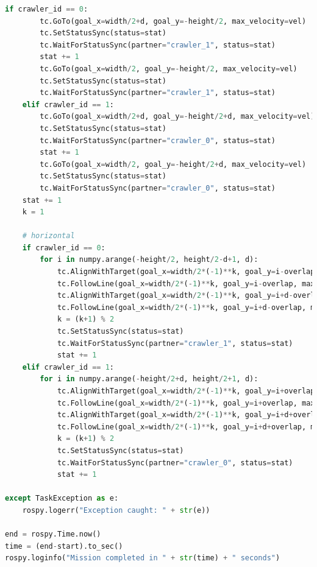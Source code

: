 \documentclass[francais,RandD]{rapportPFE}
\begin{document}
\begin{lstlisting}[language=Python,caption={Implémentation de l'algorithme de peinture au rouleau},label=lst:peinture_au_rouleau]
	if crawler_id == 0:
		tc.GoTo(goal_x=width/2+d, goal_y=-height/2, max_velocity=vel)
		tc.SetStatusSync(status=stat)
		tc.WaitForStatusSync(partner="crawler_1", status=stat)
		stat += 1
		tc.GoTo(goal_x=width/2, goal_y=-height/2, max_velocity=vel)
		tc.SetStatusSync(status=stat)
		tc.WaitForStatusSync(partner="crawler_1", status=stat)
	elif crawler_id == 1:
		tc.GoTo(goal_x=width/2+d, goal_y=-height/2+d, max_velocity=vel)
		tc.SetStatusSync(status=stat)
		tc.WaitForStatusSync(partner="crawler_0", status=stat)
		stat += 1
		tc.GoTo(goal_x=width/2, goal_y=-height/2+d, max_velocity=vel)
		tc.SetStatusSync(status=stat)
		tc.WaitForStatusSync(partner="crawler_0", status=stat)
	stat += 1
	k = 1

	# horizontal
	if crawler_id == 0:
		for i in numpy.arange(-height/2, height/2-d+1, d):
			tc.AlignWithTarget(goal_x=width/2*(-1)**k, goal_y=i-overlap)
			tc.FollowLine(goal_x=width/2*(-1)**k, goal_y=i-overlap, max_velocity=vel)
			tc.AlignWithTarget(goal_x=width/2*(-1)**k, goal_y=i+d-overlap)
			tc.FollowLine(goal_x=width/2*(-1)**k, goal_y=i+d-overlap, max_velocity=vel)
			k = (k+1) % 2
			tc.SetStatusSync(status=stat)
			tc.WaitForStatusSync(partner="crawler_1", status=stat)
			stat += 1
	elif crawler_id == 1:
		for i in numpy.arange(-height/2+d, height/2+1, d):
			tc.AlignWithTarget(goal_x=width/2*(-1)**k, goal_y=i+overlap)
			tc.FollowLine(goal_x=width/2*(-1)**k, goal_y=i+overlap, max_velocity=vel)
			tc.AlignWithTarget(goal_x=width/2*(-1)**k, goal_y=i+d+overlap)
			tc.FollowLine(goal_x=width/2*(-1)**k, goal_y=i+d+overlap, max_velocity=vel)
			k = (k+1) % 2
			tc.SetStatusSync(status=stat)
			tc.WaitForStatusSync(partner="crawler_0", status=stat)
			stat += 1

except TaskException as e:
	rospy.logerr("Exception caught: " + str(e))

end = rospy.Time.now()
time = (end-start).to_sec()
rospy.loginfo("Mission completed in " + str(time) + " seconds")
			\end{lstlisting}
\end{document}
